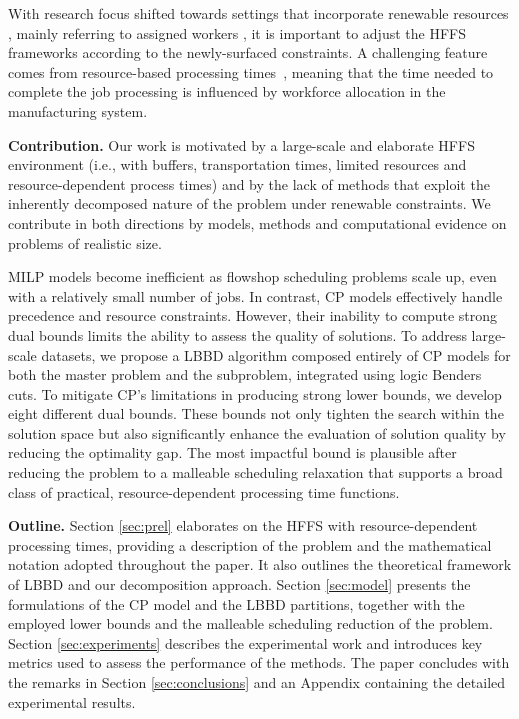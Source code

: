 \documentclass[a4paper,final]{article}
\begin{document}
With research focus shifted towards settings that incorporate renewable resources \cite{jiang2023decomposition}, mainly referring to assigned workers \cite{gong2020energy}, it is important to adjust the HFFS frameworks according to the newly-surfaced constraints. A challenging feature comes from resource-based processing times~\cite{behnamian2011hybrid, %
}, meaning that the time needed to complete the job processing is influenced by workforce allocation in the manufacturing system.

\textbf{Contribution. }%
 Our work is motivated by a large-scale and elaborate HFFS environment (i.e., with buffers, transportation times, limited resources and resource-dependent process times) and by the lack of methods that exploit the inherently decomposed nature of the problem under renewable constraints. We contribute in both directions by models, methods and computational evidence on problems of realistic size.

MILP models become inefficient as flowshop scheduling problems scale up, even with a relatively small number of jobs. In contrast, CP models effectively handle precedence and resource constraints. However, their inability to compute strong dual bounds limits the ability to assess the quality of solutions. To address large-scale datasets, we propose a LBBD algorithm composed entirely of CP models for both the master problem and the subproblem, integrated using logic Benders cuts. To mitigate CP’s limitations in producing strong lower bounds, we develop eight different dual bounds. These bounds not only tighten the search within the solution space but also significantly enhance the evaluation of solution quality by reducing the optimality gap. The most impactful bound is plausible after reducing the problem to a malleable scheduling relaxation that supports a broad class of practical, resource-dependent processing time functions.

\textbf{Outline. }Section \ref{sec:prel} elaborates on the HFFS with resource-dependent processing times, providing a description of the problem and the mathematical notation adopted throughout the paper. It also outlines the theoretical framework of LBBD and our decomposition approach. Section \ref{sec:model} presents the formulations of the CP model and the LBBD partitions, together with the employed lower bounds and the malleable scheduling reduction of the problem.
Section \ref{sec:experiments} describes the experimental work and introduces key metrics used to assess the performance of the methods.
The paper concludes with the remarks in Section \ref{sec:conclusions} and an Appendix containing the detailed experimental results.
\end{document}

